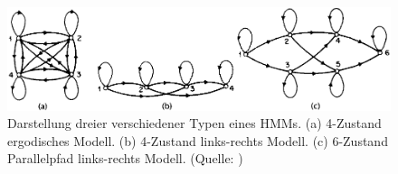 \begin{figure}[htb]
\centering
\includegraphics[width=\textwidth]{img/markov/markov_types_h.png}
\caption[Darstellung dreier verschiedener Typen eines HMMs. (a) 4-Zustand ergodisches Modell. (b) 4-Zustand links-rechts Modell. (c) 6-Zustand Parallelpfad links-rechts Modell]{Darstellung dreier verschiedener Typen eines HMMs. (a) 4-Zustand ergodisches Modell. (b) 4-Zustand links-rechts Modell. (c) 6-Zustand Parallelpfad links-rechts Modell. (Quelle: )}
\label{fig:HMMTypes}
\end{figure}

